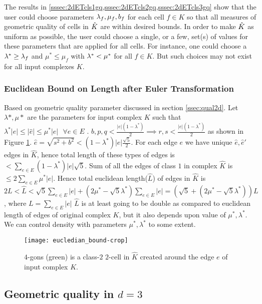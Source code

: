 \medskip
The results in \cref{sssec:2dETcls1gq,sssec:2dETcls2gq,sssec:2dETcls3gq} show that the user could choose parameters $\lambda_f,\mu_f,b_f$ for each cell $f \in K$ so that all measures of geometric quality of cells in $\hat{K}$ are within desired bounds.
In order to make $\hat{K}$ as uniform as possible, the user could choose a single, or a few, set(s) of values for these parameters that are applied for all cells.
For instance, one could choose a $\lambda^* \geq \lambda_f$ and $\mu^* \leq \mu_f$ with $\lambda^* < \mu^*$ for all $f \in K$.
But such choices may not exist for all input complexes $K$.
\subsubsection{Euclidean Bound on Length after Euler Transformation }\label{ssec:euclideanbound}
Based on geometric quality parameter discussed in section \ref{ssec:qual2d}. Let $\lambda*, \mu*$ are the parameters for input complex $K$ such that $\lambda^*|e|\leq |\hat{e}|\leq \mu^*|e|~~~\forall e \in E$ .  $b, p, q < \frac{|e|(1 - \lambda^*)}{2} \implies r, s < \frac{|e|(1 - \lambda^*)}{2}$ as shown in Figure \ref{fig:eucledian_bound-crop}.
$\hat{e} = \sqrt{s^2 + b^2} < (1 - \lambda^*)|e| \frac{\sqrt{5}}{2}$. For each edge $e$ we have unique $\hat{e}, \hat{e}'$ edges in $\hat{K}$, hence total length of these types of edges is $< \sum_{e \in E} (1 - \lambda^*)|e| \sqrt{5}$. Sum of all the edges of class $1$ in complex $\hat{K}$ is $\leq 2 \sum_{e \in E} \mu^* |e|$. Hence total euclidean length($\hat{L}$) of edges in $\hat{K}$ is 
$2L < \hat{L} < \sqrt{5}\sum_{e \in E}|e| + (2\mu^* - \sqrt{5}\lambda^*)\sum_{e \in E}|e| = (\sqrt{5} + (2\mu^* - \sqrt{5}\lambda^*))L$, where $L = \sum_{e \in E}|e|$    
$\hat{L}$ is at least going to be double as compared to euclidean length of edges of original complex $K$, but it also depends upon value of $\mu^*, \lambda^*$. We can control density with parameters $\mu^*, \lambda^*$ to some extent.
\begin{figure}[htp!] 
	\centering
	\texttt{[image: eucledian\_bound-crop]}
	\caption{$4$-gons (green) is a class-$2$ $2$-cell in $\hat{K}$ created around the edge $e$ of input complex $K$.}
	\label{fig:eucledian_bound-crop}
\end{figure}


\subsection{Geometric quality in $d=3$} \label{ssec:qual3d}

